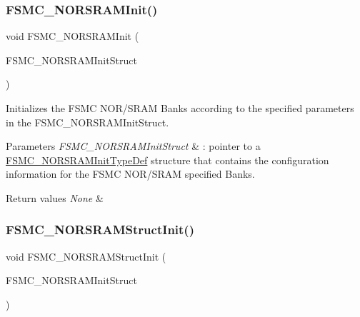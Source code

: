 \subsubsection{\texorpdfstring{FSMC\_NORSRAMInit()}{FSMC\_NORSRAMInit()}}
{\footnotesize\ttfamily void F\+S\+M\+C\+\_\+\+N\+O\+R\+S\+R\+A\+M\+Init (\begin{DoxyParamCaption}\item[{\mbox{\hyperlink{struct_f_s_m_c___n_o_r_s_r_a_m_init_type_def}{F\+S\+M\+C\+\_\+\+N\+O\+R\+S\+R\+A\+M\+Init\+Type\+Def}} $\ast$}]{F\+S\+M\+C\+\_\+\+N\+O\+R\+S\+R\+A\+M\+Init\+Struct }\end{DoxyParamCaption})}



Initializes the F\+S\+MC N\+O\+R/\+S\+R\+AM Banks according to the specified parameters in the F\+S\+M\+C\+\_\+\+N\+O\+R\+S\+R\+A\+M\+Init\+Struct. 


\begin{DoxyParams}{Parameters}
{\em F\+S\+M\+C\+\_\+\+N\+O\+R\+S\+R\+A\+M\+Init\+Struct} & \+: pointer to a \mbox{\hyperlink{struct_f_s_m_c___n_o_r_s_r_a_m_init_type_def}{F\+S\+M\+C\+\_\+\+N\+O\+R\+S\+R\+A\+M\+Init\+Type\+Def}} structure that contains the configuration information for the F\+S\+MC N\+O\+R/\+S\+R\+AM specified Banks.\\
\hline
\end{DoxyParams}

\begin{DoxyRetVals}{Return values}
{\em None} & \\
\hline
\end{DoxyRetVals}
\mbox{\label{group___f_s_m_c___exported___functions_gaf33e6dfc34f62d16a0cb416de9e83d28}} 
\subsubsection{\texorpdfstring{FSMC\_NORSRAMStructInit()}{FSMC\_NORSRAMStructInit()}}
{\footnotesize\ttfamily void F\+S\+M\+C\+\_\+\+N\+O\+R\+S\+R\+A\+M\+Struct\+Init (\begin{DoxyParamCaption}\item[{\mbox{\hyperlink{struct_f_s_m_c___n_o_r_s_r_a_m_init_type_def}{F\+S\+M\+C\+\_\+\+N\+O\+R\+S\+R\+A\+M\+Init\+Type\+Def}} $\ast$}]{F\+S\+M\+C\+\_\+\+N\+O\+R\+S\+R\+A\+M\+Init\+Struct }\end{DoxyParamCaption})}



